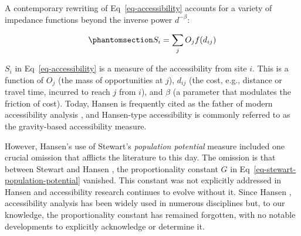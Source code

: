 \documentclass[
  10pt,
  letterpaper,
]{article}
\begin{document}
A contemporary rewriting of Eq~\ref{eq-accessibility} accounts for a
variety of impedance functions beyond the inverse power \(d^{-\beta}\):

\begin{equation}\phantomsection\label{eq-accessibility-general}{
S_{i} = \sum_j O_j  f(d_{ij})
}\end{equation}

\(S_{i}\) in Eq~\ref{eq-accessibility} is a measure of the accessibility
from site \(i\). This is a function of \(O_j\) (the mass of
opportunities at \(j\)), \(d_{ij}\) (the cost, e.g., distance or travel
time, incurred to reach \(j\) from \(i\)), and \(\beta\) (a parameter
that modulates the friction of cost). Today, Hansen is frequently cited
as the father of modern accessibility analysis
\citep[e.g.,][]{reggianiGuestEditorialNew2011}, and Hansen-type
accessibility is commonly referred to as the gravity-based accessibility
measure.

However, Hansen's use of Stewart's \emph{population potential} measure
included one crucial omission that afflicts the literature to this day.
The omission is that between Stewart
\citep{stewartDemographicGravitationEvidence1948} and Hansen
\citep{hansen1959}, the proportionality constant \(G\) in
Eq~\ref{eq-stewart-population-potential} vanished. This constant was not
explicitly addressed in Hansen \citep{hansen1959} and accessibility
research continues to evolve without it. Since Hansen
\citep{hansen1959}, accessibility analysis has been widely used in
numerous disciplines but, to our knowledge, the proportionality constant
has remained forgotten, with no notable developments to explicitly
acknowledge or determine it.
\end{document}
